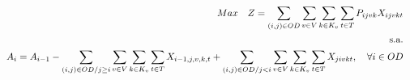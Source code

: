 \begin{eqnarray}
	&& Max \quad Z = \sum_{(i,j)\in OD} \sum_{v\in V} \sum_{k\in K_v} \sum_{t\in T} P_{ijvk} X_{ijvkt}                                                        \label{eq: m1_fo}                                                                                            \\
	&& \text{s.a.}  \notag                                                                                                                                                    \\
	&& A_{i} = A_{i-1} - \sum_{(i,j) \in OD/j \geq i} \sum_{v\in V} \sum_{k\in K_v}\sum_{t\in T}X_{i-1,j,v,k,t} + \sum_{(i,j) \in OD/j<i}\sum_{v\in V} \sum_{k\in K_v}\sum_{t\in T}X_{jivkt}, \quad \forall i \in OD  \label{eq: m1_disponi}
\end{eqnarray}
